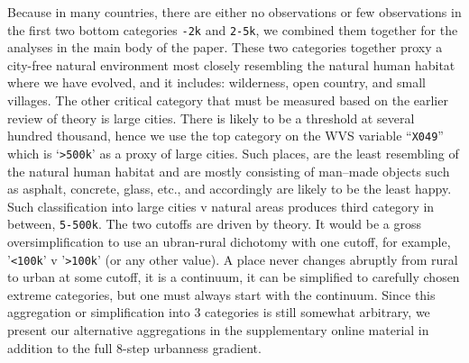 \documentclass[10pt, letterpaper]{article}
\begin{document}
Because in many countries, there are either no observations or few observations
in the first two bottom categories \texttt{-2k} and \texttt{2-5k}, we combined
them together for the analyses in the main body of the paper. These two
categories together proxy a city-free natural environment most closely
resembling the natural human habitat where we have evolved, and it includes:
wilderness, open country, and small villages. The other critical category that
must be measured based on the earlier review of theory is large cities. There is likely to be a threshold at several hundred thousand, hence we use the top category on the WVS variable ``\texttt{X049}'' which is `\texttt{>500k}' as a proxy of large cities. Such places, are the least resembling of the natural human habitat and are
mostly consisting of man--made objects such as asphalt, concrete, glass, etc., and
accordingly are likely to be the least happy. Such classification into 
large cities v natural areas produces third category in between, \texttt{5-500k}.
%
The two cutoffs are driven by theory. It would be a gross oversimplification to use
an ubran-rural dichotomy with one cutoff, for example, '\texttt{<100k}' v '\texttt{>100k}' (or any other value). A place never changes abruptly from rural to urban at some cutoff, it is a continuum, it can be simplified to carefully chosen extreme categories, but one must always start with the continuum.
%
Since this aggregation or simplification into 3 categories is still
somewhat arbitrary, we present our alternative aggregations in the supplementary
online material in addition to the full 8-step urbanness gradient. 

\end{document}
